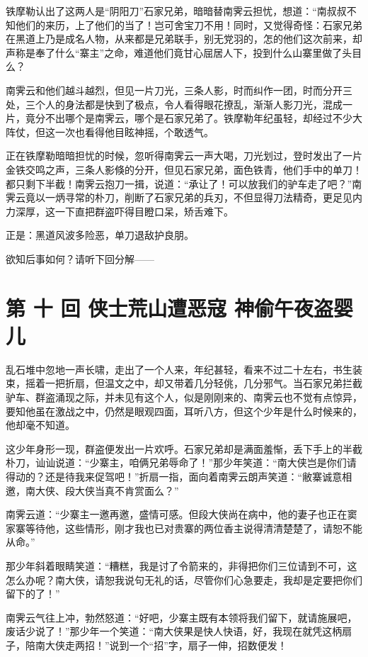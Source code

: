 \documentclass[12pt,oneside]{book}
\begin{document}
铁摩勒认出了这两人是``阴阳刀''石家兄弟，暗暗替南霁云担忧，想道：``南叔叔不知他们的来历，上了他们的当了！岂可舍宝刀不用！同时，又觉得奇怪：石家兄弟在黑道上乃是成名人物，从来都是兄弟联手，别无党羽的，怎的他们这次前来，却声称是奉了什么``寨主''之命，难道他们竟甘心屈居人下，投到什么山寨里做了头目么？

南霁云和他们越斗越烈，但见一片刀光，三条人影，时而纠作一团，时而分开三处，三个人的身法都是快到了极点，令人看得眼花撩乱，渐渐人影刀光，混成一片，竟分不出哪个是南霁云，哪个是石家兄弟了。铁摩勒年纪虽轻，却经过不少大阵仗，但这一次也看得他目眩神摇，个敢透气。

正在铁摩勒暗暗担忧的时候，忽听得南霁云一声大喝，刀光划过，登时发出了一片金铁交鸣之声，三条人影倏的分开，但见石家兄弟，面色铁青，他们手中的单刀！都只剩下半截！南霁云抱刀一揖，说道：``承让了！可以放我们的驴车走了吧？''南霁云竟以一炳寻常的朴刀，削断了石家兄弟的兵刃，不但显得刀法精奇，更足见内力深厚，这一下直把群盗吓得目瞪口呆，矫舌难下。

正是：黑道风波多险恶，单刀退敌护良朋。

欲知后事如何？请听下回分解------

\chapter{第 十 回 侠士荒山遭恶寇
神偷午夜盗婴儿}\label{ux7b2c-ux5341-ux56de-ux4fa0ux58ebux8352ux5c71ux906dux6076ux5bc7-ux795eux5077ux5348ux591cux76d7ux5a74ux513f}

乱石堆中忽地一声长啸，走出了一个人来，年纪甚轻，看来不过二十左右，书生装束，摇着一把折扇，但温文之中，却又带着几分轻佻，几分邪气。当石家兄弟拦截驴车、群盗涌现之际，并未见有这个人，似是刚刚来的、南霁云也不觉有点惊异，要知他虽在激战之中，仍然是眼观四面，耳听八方，但这个少年是什么时候来的，他却毫不知道。

这少年身形一现，群盗便发出一片欢呼。石家兄弟却是满面羞惭，丢下手上的半截朴刀，讪讪说道：``少寨主，咱俩兄弟辱命了！''那少年笑道：``南大侠岂是你们请得动的？还是待我来促驾吧！''折扇一指，面向着南霁云朗声笑道：``敝寨诚意相邀，南大侠、段大侠当真不肯赏面么？''

南霁云道：``少寨主一邀再邀，盛情可感。但段大侠尚在病中，他的妻子也正在窦家寨等待他，这些情形，刚才我也已对贵寨的两位香主说得清清楚楚了，请恕不能从命。''

那少年斜着眼睛笑道：``糟糕，我是讨了令箭来的，非得把你们三位请到不可，这怎么办呢？南大侠，请恕我说句无礼的话，尽管你们心急要走，我却是定要把你们留下的了！''

南霁云气往上冲，勃然怒道：``好吧，少寨主既有本领将我们留下，就请施展吧，废话少说了！''那少年一个笑道：``南大侠果是快人快语，好，我现在就凭这柄扇子，陪南大侠走两招！''说到一个``招''字，扇子一伸，招数便发！
\end{document}
